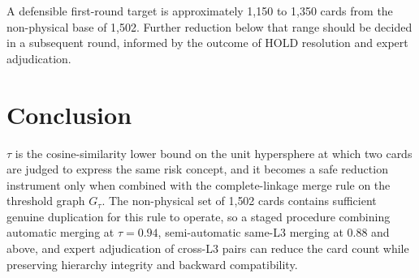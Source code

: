 \documentclass[11pt,a4paper]{article}
\begin{document}
A defensible first-round target is approximately 1{,}150 to 1{,}350 cards from the non-physical base of 1{,}502. Further reduction below that range should be decided in a subsequent round, informed by the outcome of HOLD resolution and expert adjudication.

\section*{Conclusion}

$\tau$ is the cosine-similarity lower bound on the unit hypersphere at which two cards are judged to express the same risk concept, and it becomes a safe reduction instrument only when combined with the complete-linkage merge rule on the threshold graph $G_\tau$. The non-physical set of 1{,}502 cards contains sufficient genuine duplication for this rule to operate, so a staged procedure combining automatic merging at $\tau=0.94$, semi-automatic same-L3 merging at $0.88$ and above, and expert adjudication of cross-L3 pairs can reduce the card count while preserving hierarchy integrity and backward compatibility.
\end{document}
